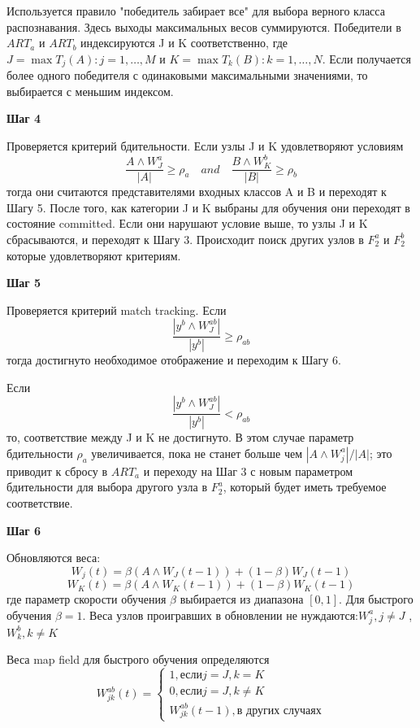 Используется правило "победитель забирает все" для выбора верного класса распознавания. Здесь выходы максимальных весов суммируются. Победители в $ART_a$ и $ART_b$ индексируются J и K соответственно, где $J = \max{T_j(A):j=1, \ldots, M}$ и $K = \max{T_k(B):k=1, \ldots, N}$. Если получается более одного победителя с одинаковыми максимальными значениями, то выбирается с меньшим индексом.

\textbf{Шаг 4}

Проверяется критерий бдительности. Если узлы J и K удовлетворяют условиям
$$
	\frac{A \wedge W_J^a}{|A|} \geq \rho_a \quad and \quad \frac{B \wedge W_K^b}{|B|} \geq \rho_b
$$
тогда они считаются представителями входных классов A и B и переходят к Шагу 5.  После того, как категории J и K выбраны для обучения они переходят в состояние committed. Если они нарушают условие выше, то узлы J и K сбрасываются, и переходят к Шагу 3. Происходит поиск других узлов в $F_2^a$ и $F_2^b$ которые удовлетворяют критериям.

\textbf{Шаг 5}
	
Проверяется критерий match tracking. Если
$$ 
	\frac{|y^b \wedge W_J^{ab}|}{|y^b|} \geq \rho_{ab}
$$
тогда достигнуто необходимое отображение и переходим к Шагу 6.

Если
$$ 
	\frac{|y^b \wedge W_J^{ab}|}{|y^b|} < \rho_{ab}
$$
то, соответствие между J и K не достигнуто. В этом случае параметр бдительности $\rho_a$ увеличивается, пока не станет больше чем $|A \wedge W_j^a| / |A|$; это приводит к сбросу в $ART_a$ и переходу на Шаг 3 с новым параметром бдительности для выбора другого узла в $F_2^a$, который будет иметь требуемое соответствие.

\textbf{Шаг 6}

Обновляются веса:
$$ 
	W_j(t) = \beta(A \wedge W_J(t-1)) + (1-\beta) W_J (t-1)
$$
$$ 
	W_K(t) = \beta(A \wedge W_K(t-1)) + (1-\beta) W_K (t-1)
$$
где параметр скорости обучения $\beta$ выбирается из диапазона $[0,1]$. Для быстрого обучения $\beta = 1$. Веса узлов проигравших в обновлении не нуждаются:$W_j^a, j\neq J$ , $W_k^b, k\neq K$

Веса map field для быстрого обучения определяются
\begin{displaymath}
	W_{jk}^{ab} (t) = \left\{
	\begin{array}{l}
		1, \mbox{если} j=J, k=K \\
		0, \mbox{если} j=J, k\neq K \\
		W_{jk}^{ab}(t-1), \mbox{в других случаях}
	\end{array}
\right .
\end{displaymath}

